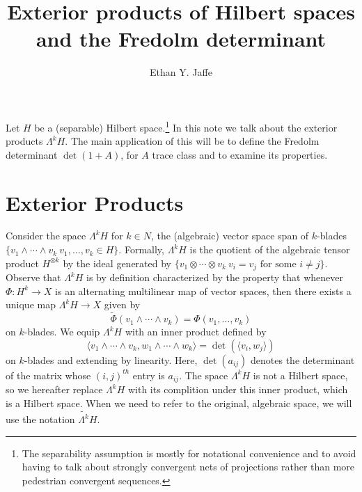 \documentclass[12pt]{amsart}
\title{Exterior products of Hilbert spaces and the Fredolm determinant}
\author{Ethan Y. Jaffe}
\date{}
\begin{document}
\maketitle
{}
Let $H$ be a (separable) Hilbert space.\footnote{The separability assumption is mostly for notational convenience and to avoid having to talk about strongly convergent nets of projections rather than more pedestrian convergent sequences.} In this note we talk about the exterior products $\Lambda^k H$. The main application of this will be to define the Fredolm determinant $\det(1+A)$, for $A$ trace class and to examine its properties.

\section{Exterior Products}

Consider the space $\Lambda^k H$ for $k \in N$, the (algebraic) vector space span of $k$-blades $\{v_1\wedge \cdots \wedge v_k\: v_1,\ldots,v_k \in H\}$. Formally, $\Lambda^k H$ is the quotient of the algebraic tensor product $H^{\otimes k}$ by the ideal generated by $\{v_1\otimes \cdots \otimes v_k \: v_i = v_j\text{ for some }i \neq j\}$. Observe that $\Lambda^k H$ is by definition characterized by the property that whenever $\Phi:H^k \to X$ is an alternating multilinear map of vector spaces, then there exists a unique map $\Lambda^k H \to X$ given by
\[\widetilde{\Phi}(v_1\wedge \cdots \wedge v_k) = \Phi(v_1,\ldots,v_k)\] on $k$-blades. We equip $\Lambda^k H$ with an inner product defined by
\begin{equation}\label{inner}\langle v_1\wedge \cdots \wedge v_k,w_1 \wedge \cdots \wedge w_k\rangle = \det(\langle v_i,w_j\rangle)\end{equation}
on $k$-blades and extending by linearity. Here, $\det(a_{ij})$ denotes the determinant of the matrix whose $(i,j)^{th}$ entry is $a_{ij}$. The space $\Lambda^k H$ is not a Hilbert space, so we hereafter replace $\Lambda^k H$ with its complition under this inner product, which is a Hilbert space. When we need to refer to the original, algebraic space, we will use the notation $\widetilde{\Lambda^k} H$. 
\end{document}
